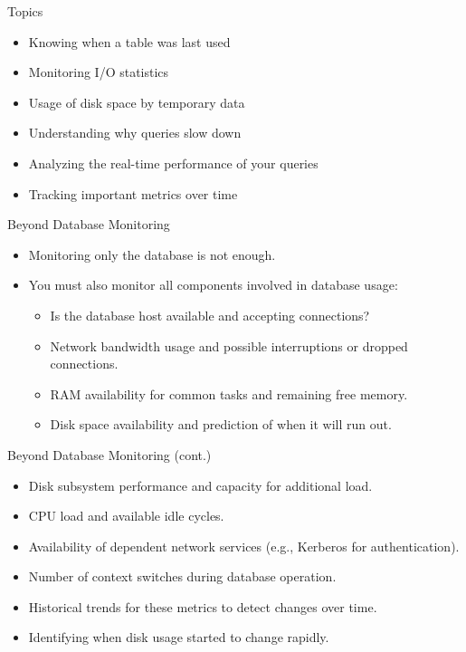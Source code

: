 \documentclass[aspectratio=169]{beamer}
\begin{document}
\begin{frame}{Topics}
    \begin{itemize}
        \item Knowing when a table was last used
        \item Monitoring I/O statistics
        \item Usage of disk space by temporary data
        \item Understanding why queries slow down
        \item Analyzing the real-time performance of your queries
        \item Tracking important metrics over time
    \end{itemize}
\end{frame}

\begin{frame}{Beyond Database Monitoring}
\begin{itemize}
    \item Monitoring only the database is not enough.
    \item You must also monitor all components involved in database usage:
    \begin{itemize}
        \item Is the database host available and accepting connections?
        \item Network bandwidth usage and possible interruptions or dropped connections.
        \item RAM availability for common tasks and remaining free memory.
        \item Disk space availability and prediction of when it will run out.
    \end{itemize}
\end{itemize}
\end{frame}

\begin{frame}{Beyond Database Monitoring (cont.)}
\begin{itemize}
    \item Disk subsystem performance and capacity for additional load.
    \item CPU load and available idle cycles.
    \item Availability of dependent network services (e.g., Kerberos for authentication).
    \item Number of context switches during database operation.
    \item Historical trends for these metrics to detect changes over time.
    \item Identifying when disk usage started to change rapidly.
\end{itemize}
\end{frame}
\end{document}
